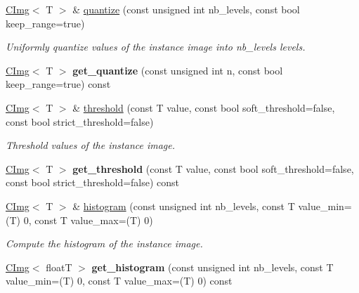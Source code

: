 \begin{DoxyCompactItemize}
\item 
\hyperlink{structcimg__library_1_1CImg}{CImg}$<$ T $>$ \& \hyperlink{structcimg__library_1_1CImg_a1116d54202176967de05d00169f2363e}{quantize} (const unsigned int nb\_\-levels, const bool keep\_\-range=true)
\begin{DoxyCompactList}\small\item\em Uniformly quantize values of the instance image into {\ttfamily nb\_\-levels} levels. \item\end{DoxyCompactList}\item 
\hypertarget{structcimg__library_1_1CImg_a17d6434494e46cae475d5d4ced9d7dca}{
\hyperlink{structcimg__library_1_1CImg}{CImg}$<$ T $>$ {\bfseries get\_\-quantize} (const unsigned int n, const bool keep\_\-range=true) const }
\label{structcimg__library_1_1CImg_a17d6434494e46cae475d5d4ced9d7dca}

\item 
\hyperlink{structcimg__library_1_1CImg}{CImg}$<$ T $>$ \& \hyperlink{structcimg__library_1_1CImg_a13bbd5b332be67ed4da405c69dab4ba7}{threshold} (const T value, const bool soft\_\-threshold=false, const bool strict\_\-threshold=false)
\begin{DoxyCompactList}\small\item\em Threshold values of the instance image. \item\end{DoxyCompactList}\item 
\hypertarget{structcimg__library_1_1CImg_af55a75599c248ae7b9e066df1fca018b}{
\hyperlink{structcimg__library_1_1CImg}{CImg}$<$ T $>$ {\bfseries get\_\-threshold} (const T value, const bool soft\_\-threshold=false, const bool strict\_\-threshold=false) const }
\label{structcimg__library_1_1CImg_af55a75599c248ae7b9e066df1fca018b}

\item 
\hyperlink{structcimg__library_1_1CImg}{CImg}$<$ T $>$ \& \hyperlink{structcimg__library_1_1CImg_a3513f6abbbfb7c9f025f9981ae52de90}{histogram} (const unsigned int nb\_\-levels, const T value\_\-min=(T) 0, const T value\_\-max=(T) 0)
\begin{DoxyCompactList}\small\item\em Compute the histogram of the instance image. \item\end{DoxyCompactList}\item 
\hypertarget{structcimg__library_1_1CImg_acb15b90fc67ccfe89c4c5d4b09aba609}{
\hyperlink{structcimg__library_1_1CImg}{CImg}$<$ floatT $>$ {\bfseries get\_\-histogram} (const unsigned int nb\_\-levels, const T value\_\-min=(T) 0, const T value\_\-max=(T) 0) const }
\label{structcimg__library_1_1CImg_acb15b90fc67ccfe89c4c5d4b09aba609}


\end{DoxyCompactItemize}
